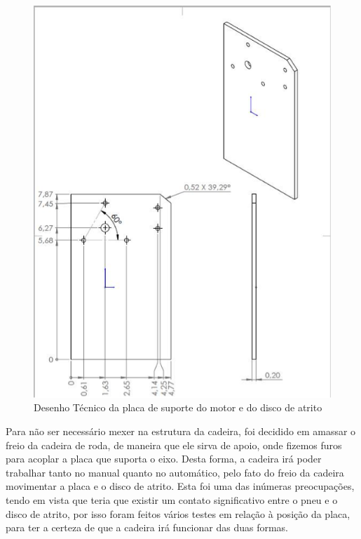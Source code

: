 \begin{figure}
    \begin{center}
        \includegraphics[scale=0.8]{figuras/support_plate.png}
    \end{center}
    \caption{Desenho Técnico da placa de suporte do motor e do disco de atrito}
    \label{fig:support_plate}
\end{figure}

Para não ser necessário mexer na estrutura da cadeira, foi decidido em amassar
o freio da cadeira de roda, de maneira que ele sirva de apoio, onde fizemos
furos para acoplar a placa que suporta o eixo. Desta forma, a cadeira irá poder
trabalhar tanto no manual quanto no automático, pelo fato do freio da cadeira
movimentar a placa e o disco de atrito. Esta foi uma das inúmeras preocupações,
tendo em vista que teria que existir um contato significativo entre o pneu e o
disco de atrito, por isso foram feitos vários testes em relação à posição da
placa, para ter a certeza de que a cadeira irá funcionar das duas formas.

